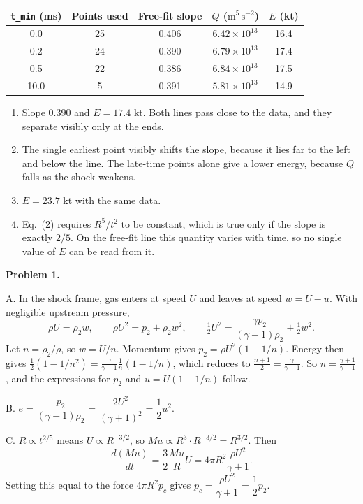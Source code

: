 \documentclass[11pt,a4paper]{article}
\begin{document}
\begin{center}\small
\begin{tabular}{ccccc}
\toprule
\headrow \texttt{t\_min} (ms) & Points used & Free-fit slope & $Q$ ($\mathrm{m^5\,s^{-2}}$) & $E$ (kt) \\
\midrule
0.0 & 25 & 0.406 & $6.42\times10^{13}$ & 16.4 \\
0.2 & 24 & 0.390 & $6.79\times10^{13}$ & 17.4 \\
0.5 & 22 & 0.386 & $6.84\times10^{13}$ & 17.5 \\
10.0 & 5 & 0.391 & $5.81\times10^{13}$ & 14.9 \\
\bottomrule
\end{tabular}
\end{center}
\begin{enumerate}[label=\textbf{\arabic*.}]
  \item Slope 0.390 and $E=17.4$ kt. Both lines pass close to the data, and they separate visibly only at the ends.
  \item The single earliest point visibly shifts the slope, because it lies far to the left and below the line. The late-time points alone give a lower energy, because $Q$ falls as the shock weakens.
  \item $E=23.7$ kt with the same data.
  \item Eq.~(2) requires $R^5/t^2$ to be constant, which is true only if the slope is exactly $2/5$. On the free-fit line this quantity varies with time, so no single value of $E$ can be read from it.
\end{enumerate}

\textbf{Problem 1.}

A. In the shock frame, gas enters at speed $U$ and leaves at speed $w=U-u$. With negligible upstream pressure,
\[\rho U=\rho_2w,\qquad \rho U^2=p_2+\rho_2w^2,\qquad \tfrac12U^2=\frac{\gamma p_2}{(\gamma-1)\rho_2}+\tfrac12w^2.\]
Let $n=\rho_2/\rho$, so $w=U/n$. Momentum gives $p_2=\rho U^2(1-1/n)$. Energy then gives $\frac12(1-1/n^2)=\frac{\gamma}{\gamma-1}\frac1n(1-1/n)$, which reduces to $\frac{n+1}{2}=\frac{\gamma}{\gamma-1}$. So $n=\frac{\gamma+1}{\gamma-1}$, and the expressions for $p_2$ and $u=U(1-1/n)$ follow.

B. $e=\dfrac{p_2}{(\gamma-1)\rho_2}=\dfrac{2U^2}{(\gamma+1)^2}=\dfrac12u^2$.

C. $R\propto t^{2/5}$ means $U\propto R^{-3/2}$, so $Mu\propto R^3\cdot R^{-3/2}=R^{3/2}$. Then
\[\frac{d(Mu)}{dt}=\frac32\frac{Mu}{R}U=4\pi R^2\frac{\rho U^2}{\gamma+1}.\]
Setting this equal to the force $4\pi R^2p_c$ gives $p_c=\dfrac{\rho U^2}{\gamma+1}=\dfrac12p_2$.\\
\end{document}
